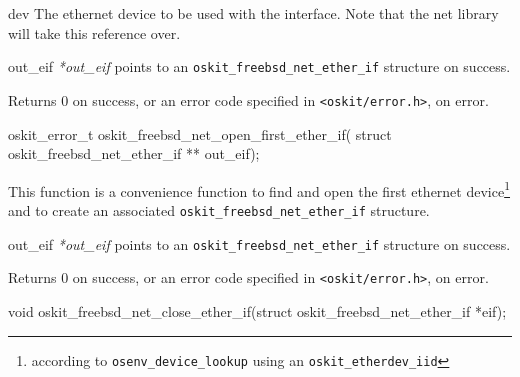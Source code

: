 \begin{apiparm}
	\item[dev] The ethernet device to be used with the interface.
	Note that the \freebsd{} net library will take this reference
	over. 
	\item[out_eif] 
        \emph{*out_eif} points to an \texttt{oskit_freebsd_net_ether_if} 
	structure on success. 
\end{apiparm}

\begin{apiret}
        Returns 0 on success, or an error code specified in
        {\tt <oskit/error.h>}, on error.
\end{apiret}

%
%
\begin{apisyn}

	\funcproto oskit_error_t
		oskit_freebsd_net_open_first_ether_if(
		\outparam struct oskit_freebsd_net_ether_if ** out_eif);
\end{apisyn}
\ostonet

\begin{apidesc}
	This function is a convenience function to find and open
	the first ethernet device\footnote{according to 
	\texttt{osenv_device_lookup} using an \texttt{oskit_etherdev_iid}}
	and to create an associated \texttt{oskit_freebsd_net_ether_if}
	structure.

\end{apidesc}

\begin{apiparm}
	\item[out_eif] 
        \emph{*out_eif} points to an \texttt{oskit_freebsd_net_ether_if} 
	structure on success. 
\end{apiparm}

\begin{apiret}
        Returns 0 on success, or an error code specified in
        {\tt <oskit/error.h>}, on error.
\end{apiret}

%
%

\begin{apisyn}

        \funcproto void 
	oskit_freebsd_net_close_ether_if(struct oskit_freebsd_net_ether_if *eif);
\end{apisyn}
\ostonet

